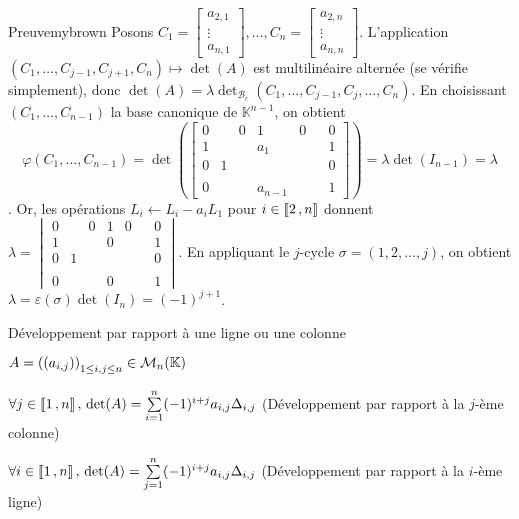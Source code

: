     \begin{demo}{Preuve}{mybrown}
        Posons $C_1 = \begin{bmatrix}
            a_{2,1} \\
            \vdots \\
            a_{n,1}
        \end{bmatrix}, \ldots, C_n = \begin{bmatrix}
            a_{2,n} \\
            \vdots \\
            a_{n,n}
        \end{bmatrix}$.
        L’application $(C_1,\ldots,C_{j-1}, C_{j+1}, C_n) \mapsto \det(A)$ est multilinéaire alternée (se vérifie simplement), donc $\det(A) = \lambda \det_{\mathcal{B}_c}(C_1,\ldots, C_{j-1}, C_{j}, \ldots, C_n)$. En choisissant $(C_1,\ldots,C_{n-1})$ la base canonique de $\mathbb{K}^{n-1}$, on obtient \[  \varphi(C_1,\ldots,C_{n-1}) = \det\left(\begin{bmatrix}
            0 & & 0 & 1 & 0 & & 0 \\
            1 & & & a_1 & & & 1 \\
            0 & 1 & & & & & 0 \\ 
            & & & & & & \\
            0 & & & a_{n-1} & & & 1 
        \end{bmatrix}\right) = \lambda \det(I_{n-1}) = \lambda \]   . Or, les opérations $L_i \leftarrow L_i - a_i L_1$ pour $i \in \left\llbracket 2 \, , n \right\rrbracket$ donnent $\lambda = \begin{vmatrix}
            0 & & 0 & 1 & 0 & & 0 \\
            1 & & & 0 & & & 1 \\
            0 & 1 & & & & & 0 \\ 
            & & & & & & \\
            0 & & & 0 & & & 1 
        \end{vmatrix}$. En appliquant le $j$-cycle $\sigma = (1,2,\ldots,j)$, on obtient $\lambda = \varepsilon(\sigma) \det(I_n) = (-1)^{j+1}$.
    \end{demo}

    \begin{theo}{Développement par rapport à une ligne ou une colonne}{}
        \begin{soient}
            \item $A = \left((a_{i,j})\right)_{1 \leq i,j \leq n} \in \mathcal{M}_{n}(\mathbb{K})$
        \end{soient}
        \begin{alors}
            \item $\forall j \in \left\llbracket 1 \, , n \right\rrbracket, \, \det(A) = \sum\limits_{i=1}^n (-1)^{i+j} a_{i,j} \Delta_{i,j}$ (Développement par rapport à la $j$-ème colonne)
            \item $\forall i \in \left\llbracket 1 \, , n \right\rrbracket, \, \det(A) = \sum\limits_{j=1}^n (-1)^{i+j} a_{i,j} \Delta_{i,j}$ (Développement par rapport à la $i$-ème ligne)
        \end{alors}
    \end{theo}

